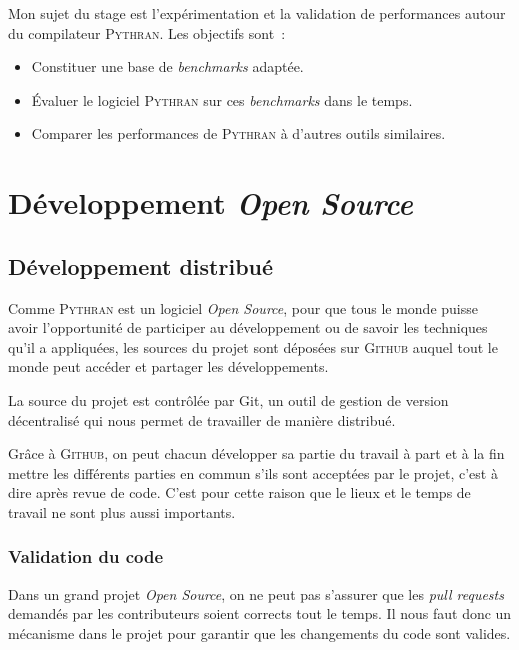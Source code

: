 \documentclass[a4paper, 11pt]{article}
\newcommand\Pythran{\textsc{Pythran}}
\newcommand\Github{\textsc{Github}}
\begin{document}
Mon sujet du stage est l'expérimentation et la validation de performances
autour du compilateur \Pythran{}. Les objectifs sont~:

  \begin{itemize}
    \item Constituer une base de \emph{benchmarks} adaptée.
    \item Évaluer le logiciel \Pythran{} sur ces \emph{benchmarks} dans le temps.
    \item Comparer les performances de \Pythran{} à d'autres outils similaires.
  \end{itemize}


\section{Développement \emph{Open Source}}
\label{sec:developpement-open-source}

\subsection*{Développement distribué}

Comme \Pythran{} est un logiciel \emph{Open Source}, pour que tous le monde
puisse avoir l'opportunité de participer au développement ou de savoir les
techniques qu'il a appliquées, les sources du projet sont déposées sur
\Github{} auquel tout le monde peut accéder et partager les développements.

La source du projet est contrôlée par Git, un outil de gestion de version
décentralisé qui nous permet de travailler de manière distribué.


Grâce à \Github{}, on peut chacun développer sa partie du travail à part et à
la fin mettre les différents parties en commun s'ils sont acceptées par le
projet, c'est à dire après revue de code. C'est pour cette raison que le lieux et le temps de travail ne sont plus aussi
importants.

\subsubsection*{Validation du code}

Dans un grand projet \emph{Open Source}, on ne peut pas s'assurer que les \emph{pull
requests} demandés par les contributeurs soient corrects tout le temps. Il nous
faut donc un mécanisme dans le projet pour garantir que les changements du code sont
valides.
\end{document}
